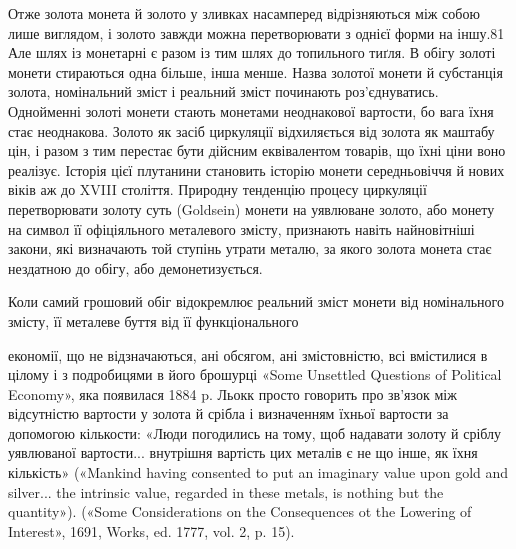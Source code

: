 Отже золота монета й золото у зливках насамперед відрізняються
між собою лише виглядом, і золото завжди можна перетворювати
з однієї форми на іншу.81 Але шлях із монетарні є разом
із тим шлях до топильного тиґля. В обігу золоті монети стираються
одна більше, інша менше. Назва золотої монети й субстанція
золота, номінальний зміст і реальний зміст починають роз’єднуватись.
Однойменні золоті монети стають монетами неоднакової
вартости, бо вага їхня стає неоднакова. Золото як засіб циркуляції
відхиляється від золота як маштабу цін, і разом з тим перестає
бути дійсним еквівалентом товарів, що їхні ціни воно реалізує.
Історія цієї плутанини становить історію монети середньовіччя
й нових віків аж до XVIII століття. Природну тенденцію процесу
циркуляції перетворювати золоту суть (Goldsein) монети на
уявлюване золото, або монету на символ її офіціяльного металевого
змісту, признають навіть найновітніші закони, які визначають
той ступінь утрати металю, за якого золота монета стає нездатною
до обігу, або демонетизується.

Коли самий грошовий обіг відокремлює реальний зміст монети
від номінального змісту, її металеве буття від її функціонального

економії, що не відзначаються, ані обсягом, ані змістовністю, всі вмістилися
в цілому і з подробицями в його брошурці «Some Unsettled Questions
of Political Economy», яка появилася 1884 p. Льокк просто говорить
про зв’язок між відсутністю вартости у золота й срібла і визначенням
їхньої вартости за допомогою кількости: «Люди погодились на тому, щоб
надавати золоту й сріблу уявлюваної вартости... внутрішня вартість цих
металів є не що інше, як їхня кількість» («Mankind having consented
to put an imaginary value upon gold and silver... the intrinsic value, regarded
in these metals, is nothing but the quantity»). («Some Considerations
on the Consequences ot the Lowering of Interest», 1691, Works, ed. 1777,
vol. 2, p. 15).

